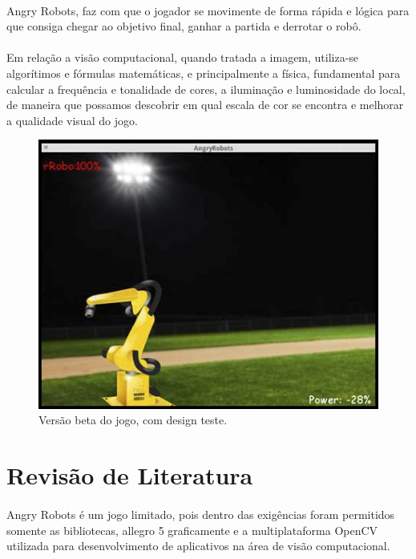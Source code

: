\documentclass{sciposter}
\begin{document}
\begin{multicols}{3}
\paragraph{}Angry Robots, faz com que o jogador se movimente de forma rápida e lógica para que consiga chegar ao objetivo final, ganhar a partida e derrotar o robô.
\paragraph{}Em relação a visão computacional, quando tratada a imagem, utiliza-se algorítimos e fórmulas matemáticas, e principalmente a física, fundamental para calcular a frequência e tonalidade de cores, a iluminação e luminosidade do local, de maneira que possamos descobrir em qual escala de cor se encontra e melhorar a qualidade visual do jogo.

\begin{figure}[!htb]
\centering
\includegraphics[scale=1.4]{betateste.jpg}
\caption{Versão beta do jogo, com design teste.}
\end{figure}

\vspace{0.7cm}

\newcommand{\imsize}{0.45\columnwidth}

\section{Revisão de Literatura}
\paragraph{}Angry Robots é um jogo limitado, pois dentro das exigências foram permitidos somente as bibliotecas, allegro 5 graficamente e a multiplataforma OpenCV utilizada para desenvolvimento de aplicativos na área de visão computacional.

\end{multicols}
\end{document}
